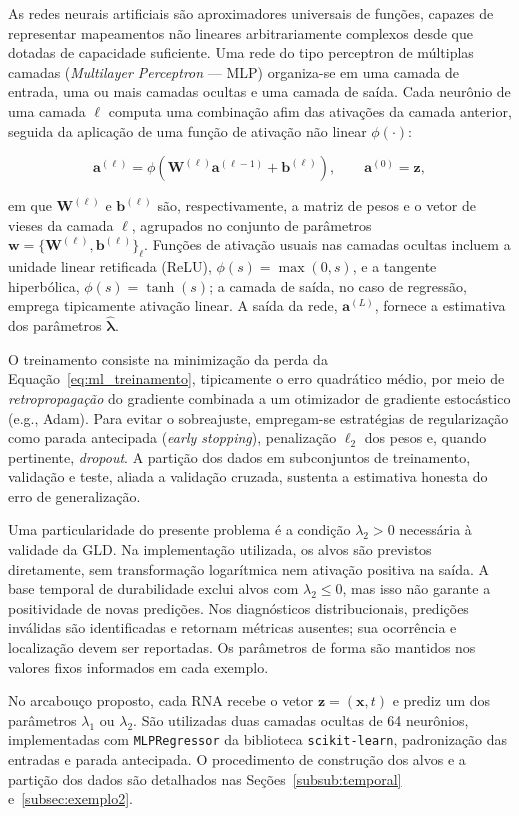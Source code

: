 As redes neurais artificiais são aproximadores universais de funções, capazes de representar mapeamentos não lineares arbitrariamente complexos desde que dotadas de capacidade suficiente. Uma rede do tipo perceptron de múltiplas camadas (\textit{Multilayer Perceptron} --- MLP) organiza-se em uma camada de entrada, uma ou mais camadas ocultas e uma camada de saída. Cada neurônio de uma camada $\ell$ computa uma combinação afim das ativações da camada anterior, seguida da aplicação de uma função de ativação não linear $\phi(\cdot)$:

\begin{equation}
\mathbf{a}^{(\ell)} = \phi\!\left(\mathbf{W}^{(\ell)} \mathbf{a}^{(\ell-1)} + \mathbf{b}^{(\ell)}\right), \qquad \mathbf{a}^{(0)} = \mathbf{z},
\label{eq:mlp_forward}
\end{equation}

\noindent em que $\mathbf{W}^{(\ell)}$ e $\mathbf{b}^{(\ell)}$ são, respectivamente, a matriz de pesos e o vetor de vieses da camada $\ell$, agrupados no conjunto de parâmetros $\mathbf{w} = \{\mathbf{W}^{(\ell)}, \mathbf{b}^{(\ell)}\}_\ell$. Funções de ativação usuais nas camadas ocultas incluem a unidade linear retificada (ReLU), $\phi(s) = \max(0,s)$, e a tangente hiperbólica, $\phi(s) = \tanh(s)$; a camada de saída, no caso de regressão, emprega tipicamente ativação linear. A saída da rede, $\mathbf{a}^{(L)}$, fornece a estimativa dos parâmetros $\hat{\boldsymbol{\lambda}}$.

O treinamento consiste na minimização da perda da Equação~\eqref{eq:ml_treinamento}, tipicamente o erro quadrático médio, por meio de \textit{retropropagação} do gradiente combinada a um otimizador de gradiente estocástico (e.g., Adam). Para evitar o sobreajuste, empregam-se estratégias de regularização como parada antecipada (\textit{early stopping}), penalização $\ell_2$ dos pesos e, quando pertinente, \textit{dropout}. A partição dos dados em subconjuntos de treinamento, validação e teste, aliada a validação cruzada, sustenta a estimativa honesta do erro de generalização.

Uma particularidade do presente problema é a condição $\lambda_2>0$ necessária à validade da GLD. Na implementação utilizada, os alvos são previstos diretamente, sem transformação logarítmica nem ativação positiva na saída. A base temporal de durabilidade exclui alvos com $\lambda_2\leq0$, mas isso não garante a positividade de novas predições. Nos diagnósticos distribucionais, predições inválidas são identificadas e retornam métricas ausentes; sua ocorrência e localização devem ser reportadas. Os parâmetros de forma são mantidos nos valores fixos informados em cada exemplo.

No arcabouço proposto, cada RNA recebe o vetor $\mathbf{z}=(\mathbf{x},t)$ e prediz um dos parâmetros $\lambda_1$ ou $\lambda_2$. São utilizadas duas camadas ocultas de 64 neurônios, implementadas com \texttt{MLPRegressor} da biblioteca \texttt{scikit-learn}, padronização das entradas e parada antecipada. O procedimento de construção dos alvos e a partição dos dados são detalhados nas Seções~\ref{subsub:temporal} e~\ref{subsec:exemplo2}.
